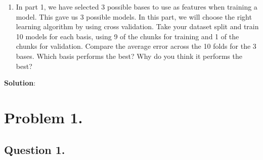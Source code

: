\documentclass[submit]{../harvardml}
\newenvironment{solution}{
    \vspace{2mm}
    \color{blue}\noindent\textbf{Solution}:
}{}
\begin{document}
\begin{problem}
\begin{enumerate}
  
      \item In part 1, we have selected 3 possible bases to use as features when training a model. This gave us 3 possible models. In this part, we will choose the right learning algorithm by using cross validation. Take your dataset split and train 10 models for each basis, using 9 of the chunks for training and 1 of the chunks for validation. Compare the average error across the 10 folds for the 3 bases. Which basis performs the best? Why do you think it performs the best?    

      
  \end{enumerate}
\end{problem}

\newpage

\begin{solution}

\section{Problem 1.}

\subsection{Question 1.}


\end{solution}
\end{document}
